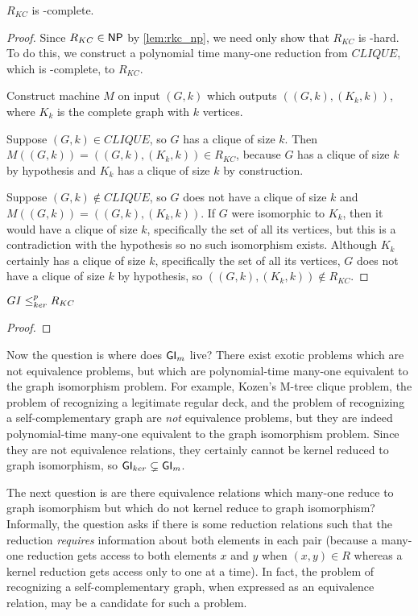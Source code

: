 \begin{theorem}$R_{KC}$ is \NP-complete.\end{theorem}
\begin{proof}Since $R_{KC}\in{\ensuremath{\mathsf{NP}}}$ by \autoref{lem:rkc_np}, we need only show
  that $R_{KC}$ is \NP-hard. To do this, we construct a polynomial time
  many-one reduction from $CLIQUE$, which is \NP-complete, to $R_{KC}$.

  Construct machine $M$ on input $(G, k)$ which outputs $((G, k), (K_k, k))$,
  where $K_k$ is the complete graph with $k$ vertices.

  Suppose $(G,k)\in CLIQUE$, so $G$ has a clique of size $k$. Then
  $M((G,k))=((G,k), (K_k, k))\in R_{KC}$, because $G$ has a clique of size
  $k$ by hypothesis and $K_k$ has a clique of size $k$ by construction.
  
  Suppose $(G,k)\notin CLIQUE$, so $G$ does not have a clique of size $k$ and
  $M((G,k))=((G,k), (K_k, k))$. If $G$ were isomorphic to $K_k$, then it would
  have a clique of size $k$, specifically the set of all its vertices, but this
  is a contradiction with the hypothesis so no such isomorphism
  exists. Although $K_k$ certainly has a clique of size $k$, specifically the
  set of all its vertices, $G$ does not have a clique of size $k$ by
  hypothesis, so $((G, k), (K_k, k))\notin R_{KC}$.
\end{proof}

\begin{theorem}$GI\leq^{p}_{ker} R_{KC}$\end{theorem}
\begin{proof}

\end{proof}


Now the question is where does ${\mathsf{GI}}_m$ live? There exist exotic problems which
are not equivalence problems, but which are polynomial-time many-one equivalent
to the graph isomorphism problem. For example, Kozen's M-tree clique problem,
the problem of recognizing a legitimate regular deck, and the problem of
recognizing a self-complementary graph are \emph{not} equivalence problems, but
they are indeed polynomial-time many-one equivalent to the graph isomorphism
problem. Since they are not equivalence relations, they certainly cannot be
kernel reduced to graph isomorphism, so ${\mathsf{GI}}_{ker}\subsetneq{\ensuremath{\mathsf{GI}}}_m$.

The next question is are there equivalence relations which many-one reduce to
graph isomorphism but which do not kernel reduce to graph isomorphism?
Informally, the question asks if there is some reduction relations such that
the reduction \emph{requires} information about both elements in each pair
(because a many-one reduction gets access to both elements $x$ and $y$ when
$(x,y)\in R$ whereas a kernel reduction gets access only to one at a time). In
fact, the problem of recognizing a self-complementary graph, when expressed as
an equivalence relation, may be a candidate for such a problem.

